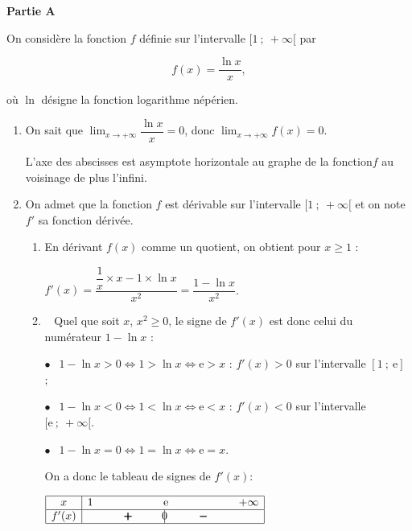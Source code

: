 
\bigskip

\textbf{Partie A}

\medskip

On considère la fonction $f$ définie sur l'intervalle $[1~;~+\infty[$ par 

\[f(x) = \dfrac{\ln x}{x},\]

où $\ln$ désigne la fonction logarithme népérien.

\medskip

\begin{enumerate}
\item %
On sait que $\displaystyle\lim_{x \to + \infty} \dfrac{\ln x}{x} = 0$, donc $\displaystyle\lim_{x \to + \infty} f(x) = 0$.

L'axe des abscisses est asymptote horizontale au graphe de la fonction$f$ au voisinage de plus l'infini.
\item On admet que la fonction $f$ est dérivable sur l'intervalle $[1~;~+\infty[$ et on note $f'$ sa fonction dérivée.
	\begin{enumerate}
		\item %
En dérivant $f(x)$ comme un quotient, on obtient pour $x \geqslant 1$ :
		
$f'(x) = \dfrac{\dfrac{1}{x} \times x - 1 \times \ln x}{x^2} = \dfrac{1 - \ln x}{x^2}$.

		\item~ %
Quel que soit $x$,\: $x^2 \geqslant 0$, le signe de $f'(x)$ est donc celui du numérateur $1 - \ln x$ :

$\bullet~~$ $1 - \ln x > 0 \iff 1 > \ln x \iff \text{e} > x$ : $f'(x) > 0$ sur l'intervalle $[1~;~\text{e}]$ ;

$\bullet~~$ $1 - \ln x < 0 \iff 1 < \ln x \iff \text{e} < x$ : $f'(x) < 0$ sur l'intervalle $[\text{e}~;~+ \infty[$.

$\bullet~~$ $1 - \ln x = 0 \iff 1 = \ln x \iff \text{e} = x$.

On a donc le tableau de signes de $f'(x)$:

\begin{center}
\renewcommand{\arraystretch}{1.2}
\def\esp{\hspace*{1.5cm}}
$\begin{array}{|c | *{5}{c} |} 
\hline
x  & 1 & \esp & \text e & \esp  & +\infty \\
\hline
f'(x) &  & \pmb{+} &  \vline\hspace{-2.7pt}{0} & \pmb{-} &    \\
\hline
\end{array}$
\renewcommand{\arraystretch}{1}
\end{center}


\end{enumerate}
\end{enumerate}
